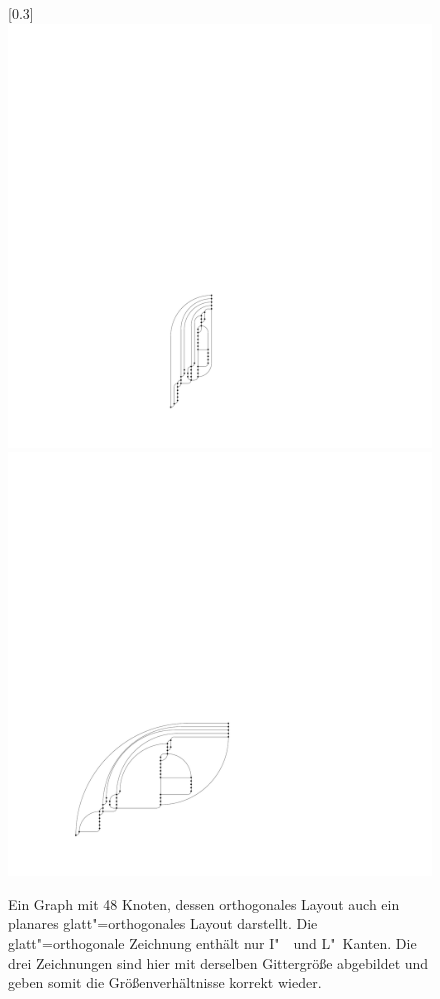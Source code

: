 \documentclass[a4paper]{scrreprt}
\theoremstyle{definition}
\begin{document}
\begin{figure}[h]
        \quad
       [0.3\textwidth]
            {\includegraphics[scale=.7]{compliantGraph/isOk}}
        \quad
            {\includegraphics[scale=.7]{compliantGraph/isHuge}}
 
 
        \caption{Ein Graph mit 48 Knoten, dessen orthogonales Layout auch ein planares glatt"=orthogonales Layout darstellt. Die glatt"=orthogonale Zeichnung enthält nur I"~~und L"~Kanten. Die drei Zeichnungen sind hier mit derselben Gittergröße abgebildet und geben somit die Größenverhältnisse korrekt wieder.}
        \label{fig:smoothOkness}
\end{figure}
\end{document}
